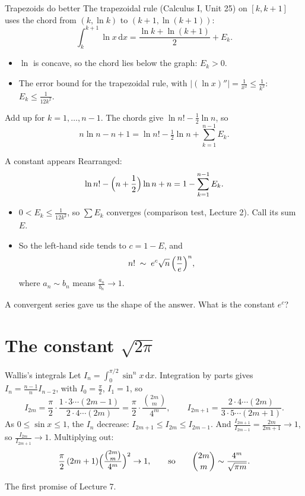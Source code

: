 \documentclass[10pt]{wosm-slides}
\newcommand{\dx}{\,\mathrm{d}x}
\begin{document}
\begin{frame}{Trapezoids do better}
  The trapezoidal rule (Calculus I, Unit 25) on $[k, k+1]$ uses the chord from $(k, \ln k)$ to
  $(k+1, \ln(k+1))$:
  \[ \int_k^{k+1} \ln x \dx = \frac{\ln k + \ln(k+1)}{2} + E_k . \]
  \pause
  \begin{itemize}
    \item $\ln$ is concave, so the chord lies below the graph: $E_k > 0$.
    \item The error bound for the trapezoidal rule, with $|(\ln x)''| = \frac{1}{x^2} \le \frac{1}{k^2}$:
      \ $E_k \le \frac{1}{12 k^2}$.
  \end{itemize}
  \pause
  Add up for $k = 1, \dots, n - 1$. The chords give $\ln n! - \frac12 \ln n$, so
  \[ n \ln n - n + 1 = \ln n! - \tfrac12 \ln n + \sum_{k=1}^{n-1} E_k . \]
\end{frame}

\begin{frame}{A constant appears}
  Rearranged:
  \[ \ln n! - \Bigl(n + \frac12\Bigr)\ln n + n = 1 - \sum_{k=1}^{n-1} E_k . \]
  \pause
  \begin{itemize}
    \item $0 < E_k \le \frac{1}{12k^2}$, so $\sum E_k$ converges (comparison test, Lecture 2).
      Call its sum $E$.
    \item So the left-hand side tends to $c = 1 - E$, and
      \[ n! \;\sim\; e^c \sqrt{n}\, \Bigl(\frac{n}{e}\Bigr)^n , \]
      where $a_n \sim b_n$ means $\frac{a_n}{b_n} \to 1$.
  \end{itemize}
  \pause
  {\small A convergent series gave us the shape of the answer. What is the constant $e^c$?\par}
\end{frame}

\section{The constant $\sqrt{2\pi}$}

\begin{frame}{Wallis's integrals}
  Let $I_n = \int_0^{\pi/2} \sin^n x \dx$. Integration by parts gives
  $I_n = \frac{n-1}{n} I_{n-2}$, with $I_0 = \frac\pi2$, $I_1 = 1$, so
  \[ I_{2m} = \frac\pi2 \cdot \frac{1 \cdot 3 \cdots (2m-1)}{2 \cdot 4 \cdots (2m)}
     = \frac\pi2 \cdot \frac{\binom{2m}{m}}{4^m}, \qquad
     I_{2m+1} = \frac{2 \cdot 4 \cdots (2m)}{3 \cdot 5 \cdots (2m+1)} . \]
  \pause
  As $0 \le \sin x \le 1$, the $I_n$ decrease: $I_{2m+1} \le I_{2m} \le I_{2m-1}$. And
  $\frac{I_{2m+1}}{I_{2m-1}} = \frac{2m}{2m+1} \to 1$, so $\frac{I_{2m}}{I_{2m+1}} \to 1$. Multiplying out:
  \[ \frac{\pi}{2}\,(2m+1) \Bigl(\frac{\binom{2m}{m}}{4^m}\Bigr)^2 \to 1 ,
     \qquad\text{so}\qquad
     \binom{2m}{m} \sim \frac{4^m}{\sqrt{\pi m}} . \]
  {\small The first promise of Lecture 7.\par}
\end{frame}
\end{document}
